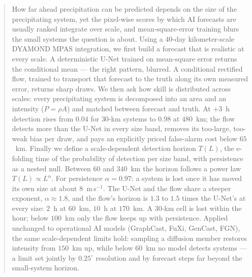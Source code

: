 \documentclass[draft]{agujournal2019}
\begin{document}
\begin{abstract}
How far ahead precipitation can be predicted depends on the size of the
precipitating system, yet the pixel-wise scores by which AI forecasts are
usually ranked integrate over scale, and mean-square-error training blurs
the small systems the question is about. Using a 40-day kilometer-scale DYAMOND MPAS integration,
we first build a forecast that is realistic at every scale. A deterministic
U-Net trained on mean-square error returns the conditional mean --- the right
pattern, blurred. A conditional rectified flow, trained to transport that
forecast to the truth along its own measured error, returns sharp draws. We
then ask how skill is distributed across scales: every precipitating system
is decomposed into an area and an intensity ($P = \rho A$) and matched
between forecast and truth. At $+3$~h detection rises from $0.04$ for
$30$-km systems to $0.98$ at $480$~km; the flow detects more than the U-Net
in every size band, removes its too-large, too-weak bias per draw, and pays
an explicitly priced false-alarm cost below $65$~km. Finally we define a
scale-dependent detection horizon $T(L)$, the e-folding time of the
probability of detection per size band, with persistence as a nested null.
Between $60$ and $340$~km the horizon follows a power law
$T(L) \propto L^{\alpha}$. For persistence $\alpha = 0.97$: a system is
lost once it has moved its own size at about $8$~m\,s$^{-1}$. The U-Net and
the flow share a steeper exponent, $\alpha \approx 1.8$, and the flow's
horizon is $1.3$ to $1.5$ times the U-Net's at every size: $2$~h at
$60$~km, $10$~h at $170$~km. A $30$-km cell is lost within the hour; below
$100$~km only the flow keeps up with persistence. Applied unchanged to
operational AI models (GraphCast, FuXi, GenCast, FGN), the same
scale-dependent limits hold: sampling a diffusion member restores intensity
from $150$~km up, while below $60$~km no model detects systems --- a limit
set jointly by $0.25^{\circ}$ resolution and by forecast steps far beyond the
small-system horizon.
\end{abstract}
\end{document}

